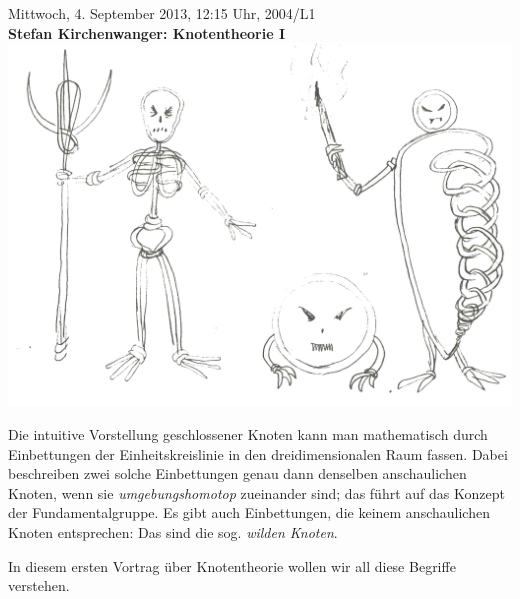 \documentclass[a4paper,ngerman,landscape]{scrartcl}
\begin{document}
\begin{center}
  \Huge
  Mittwoch, 4. September 2013, 12:15 Uhr, 2004/L1 \\
  \textbf{Stefan Kirchenwanger: Knotentheorie I}
  \vfill
  \includegraphics[scale=0.9]{knotenarmee-einfach}
  \vfill

  \Large
  \begin{minipage}{0.91\textwidth}
    \setlength\parskip{\medskipamount}
    Die intuitive Vorstellung geschlossener Knoten kann man mathematisch durch
    Einbettungen der Einheitskreislinie in den dreidimensionalen Raum fassen.
    Dabei beschreiben zwei solche Einbettungen genau dann denselben
    anschaulichen Knoten, wenn sie \emph{umgebungshomotop} zueinander sind; das führt
    auf das Konzept der Fundamentalgruppe. Es gibt auch Einbettungen, die
    keinem anschaulichen Knoten entsprechen: Das sind die sog. \emph{wilden
    Knoten}.

    In diesem ersten Vortrag über Knotentheorie wollen wir all diese Begriffe
    verstehen.
  \end{minipage}
\end{center}
\end{document}
